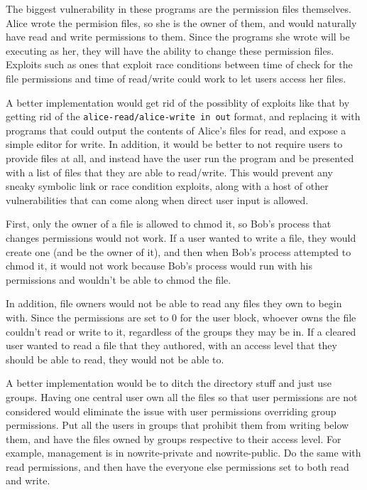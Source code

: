 \documentclass{jhwhw}
\begin{document}
The biggest vulnerability in these programs are the permission files themselves. Alice wrote the permision files, so she is the owner of them, and would naturally have read and write permissions to them. Since the programs she wrote will be executing as her, they will have the ability to change these permission files. Exploits such as ones that exploit race conditions between time of check for the file permissions and time of read/write could work to let users access her files.

A better implementation would get rid of the possiblity of exploits like that by getting rid of the \verb^alice-read/alice-write in out^ format, and replacing it with programs that could output the contents of Alice's files for read, and expose a simple editor for write. In addition, it would be better to not require users to provide files at all, and instead have the user run the program and be presented with a list of files that they are able to read/write. This would prevent any sneaky symbolic link or race condition exploits, along with a host of other vulnerabilities that can come along when direct user input is allowed.

First, only the owner of a file is allowed to chmod it, so Bob's process that changes permissions would not work. If a user wanted to write a file, they would create one (and be the owner of it), and then when Bob's process attempted to chmod it, it would not work because Bob's process would run with his permissions and wouldn't be able to chmod the file.

In addition, file owners would not be able to read any files they own to begin with. Since the permissions are set to 0 for the user block, whoever owns the file couldn't read or write to it, regardless of the groups they may be in. If a cleared user wanted to read a file that they authored, with an access level that they should be able to read, they would not be able to.

A better implementation would be to ditch the directory stuff and just use groups. Having one central user own all the files so that user permissions are not considered would eliminate the issue with user permissions overriding group permissions. Put all the users in groups that prohibit them from writing below them, and have the files owned by groups respective to their access level. For example, management is in nowrite-private and nowrite-public. Do the same with read permissions, and then have the everyone else permissions set to both read and write.
\end{document}
